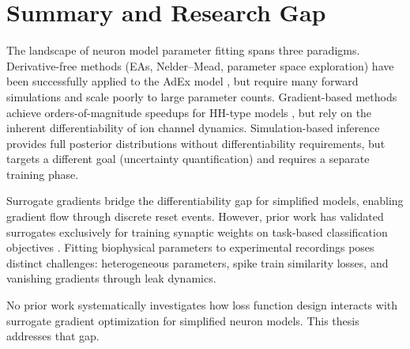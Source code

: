 \section{Summary and Research Gap}\label{sec:rw:summary}

The landscape of neuron model parameter fitting spans three paradigms.
Derivative-free methods (\glspl{EA}, Nelder--Mead, parameter space exploration) have been successfully applied to the \gls{AdEx} model \cite{Marin2020, Cruz2021, Guarino2025}, but require many forward simulations and scale poorly to large parameter counts.
Gradient-based methods achieve orders-of-magnitude speedups for \gls{HH}-type models \cite{Deistler2025, Jones2024}, but rely on the inherent differentiability of ion channel dynamics.
Simulation-based inference \cite{Goncalves2020} provides full posterior distributions without differentiability requirements, but targets a different goal (uncertainty quantification) and requires a separate training phase.

Surrogate gradients bridge the differentiability gap for simplified models, enabling gradient flow through discrete reset events.
However, prior work has validated surrogates exclusively for training synaptic weights on task-based classification objectives \cite{Neftci2019, Zenke2018, Gerum2021, Perez-Nieves2021}.
Fitting biophysical parameters to experimental recordings poses distinct challenges: heterogeneous parameters, spike train similarity losses, and vanishing gradients through leak dynamics.

No prior work systematically investigates how loss function design interacts with surrogate gradient optimization for simplified neuron models.
This thesis addresses that gap.
